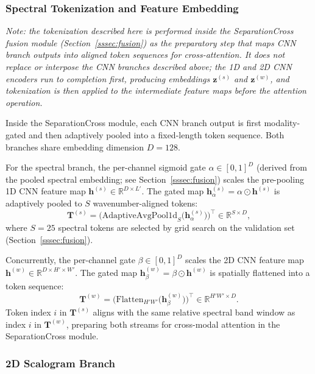 \documentclass[preprint,12pt]{elsarticle}
\begin{document}
\subsubsection{Spectral Tokenization and Feature Embedding}
\textit{Note: the tokenization described here is performed inside the
SeparationCross fusion module (Section~\ref{sssec:fusion}) as the
preparatory step that maps CNN branch outputs into aligned token
sequences for cross-attention. It does not replace or interpose the
CNN branches described above; the 1D and 2D CNN encoders run to
completion first, producing embeddings $\mathbf{z}^{(s)}$ and
$\mathbf{z}^{(w)}$, and tokenization is then applied to the
intermediate feature maps before the attention operation.}

Inside the SeparationCross module, each CNN branch output is first
modality-gated and then adaptively pooled into a fixed-length token
sequence. Both branches share embedding dimension $D{=}128$.

For the spectral branch, the per-channel sigmoid gate
$\alpha \in [0,1]^{D}$ (derived from the pooled spectral embedding;
see Section~\ref{sssec:fusion}) scales the pre-pooling 1D CNN feature
map $\mathbf{h}^{(s)} \in \mathbb{R}^{D \times L'}$.
The gated map $\mathbf{h}_\alpha^{(s)} = \alpha \odot \mathbf{h}^{(s)}$
is adaptively pooled to $S$ wavenumber-aligned tokens:
\begin{equation}
    \mathbf{T}^{(s)} =
      \bigl(\mathrm{AdaptiveAvgPool1d}_{S}\!\bigl(\mathbf{h}_\alpha^{(s)}
      \bigr)\bigr)^{\!\top} \in \mathbb{R}^{S \times D},
\end{equation}
where $S{=}25$ spectral tokens are selected by grid search on the
validation set (Section~\ref{sssec:fusion}).

Concurrently, the per-channel gate $\beta \in [0,1]^{D}$ scales the
2D CNN feature map $\mathbf{h}^{(w)} \in \mathbb{R}^{D \times H' \times W'}$.
The gated map $\mathbf{h}_\beta^{(w)} = \beta \odot \mathbf{h}^{(w)}$
is spatially flattened into a token sequence:
\begin{equation}
    \mathbf{T}^{(w)} =
      \bigl(\mathrm{Flatten}_{H'W'}\!\bigl(\mathbf{h}_\beta^{(w)}
      \bigr)\bigr)^{\!\top} \in \mathbb{R}^{H'W' \times D}.
\end{equation}
Token index $i$ in $\mathbf{T}^{(s)}$ aligns with the same relative
spectral band window as index $i$ in $\mathbf{T}^{(w)}$, preparing
both streams for cross-modal attention in the SeparationCross module.
\subsubsection{2D Scalogram Branch}
\label{sssec:branch2d}
\end{document}
